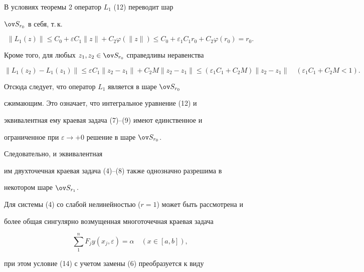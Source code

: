  


\begin{pf} 


В условиях теоремы 2 оператор $L_1$ (12) переводит шар 


$\ov S_{r_0}$ в себя, т.\,к. 


$$ 


\|L_1(z)\|\le C_0+\varepsilon C_1\|z\|+ 


C_2\varphi(\|z\|)\le C_0+\varepsilon_1C_1r_0+ 


C_2\varphi(r_0)=r_0. 


$$ 


Кроме того, для любых $z_1,z_2\in\ov S_{r_0}$ справедливы неравенства 


$$ 


\|L_1(z_2)-L_1(z_1)\|\le\varepsilon C_1\|z_2-z_1\|+ 


C_2M\|z_2-z_1\|\le(\varepsilon_1C_1+C_2M)\|z_2-z_1\|\quad 


(\varepsilon_1C_1+C_2M<1). 


$$ 


Отсюда следует, что оператор $L_1$ является в шаре $\ov S_{r_0}$ 


сжимающим. Это означает, что интегральное уравнение (12) и 


эквивалентная ему краевая задача (7)--(9) имеют единственное и 


ограниченное при $\varepsilon\to+0$ решение в шаре $\ov S_{r_0}$. 


Следовательно, и эквивалентная 


им двухточечная краевая задача (4)--(8) также однозначно разрешима в 


некотором шаре $\ov S_{r_1}$. 


\end{pf} 


 


Для системы (4) со слабой нелинейностью ($r=1$) может быть рассмотрена и 


более общая сингулярно возмущенная многоточечная краевая задача 


\begin{equation} 


\sum^n_1F_j y(x_j,\varepsilon)=\alpha\quad 


(x\in[a,b]), 


\end{equation} 


при этом условие (14) с учетом замены (6) преобразуется к виду 


